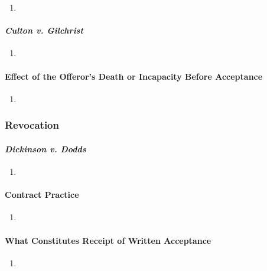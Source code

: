 \begin{enumerate}
    \item %
\end{enumerate}

\paragraph{\emph{Culton v. Gilchrist}}

\begin{enumerate}
    \item %
\end{enumerate}

\paragraph{Effect of the Offeror's Death or Incapacity Before Acceptance}

\begin{enumerate}
    \item %
\end{enumerate}

\subsubsection{Revocation}

\paragraph{\emph{Dickinson v. Dodds}}

\begin{enumerate}
    \item %
\end{enumerate}

\paragraph{Contract Practice}

\begin{enumerate}
    \item %
\end{enumerate}

\paragraph{What Constitutes Receipt of Written Acceptance}

\begin{enumerate}
    \item %
\end{enumerate}

